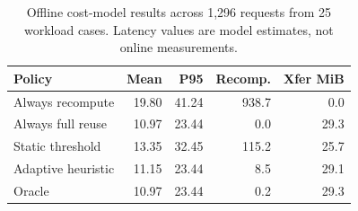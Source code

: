 \begin{table}[t]
\centering
\setlength{\tabcolsep}{3pt}
\footnotesize
\caption{Offline cost-model results across 1,296 requests from 25 workload cases. Latency values are model estimates, not online measurements.}
\label{tab:offline-summary}
\begin{tabular}{@{}lrrrr@{}}
\toprule
Policy & Mean & P95 & Recomp. & Xfer MiB \\
\midrule
Always recompute & 19.80 & 41.24 & 938.7 & 0.0 \\
Always full reuse & 10.97 & 23.44 & 0.0 & 29.3 \\
Static threshold & 13.35 & 32.45 & 115.2 & 25.7 \\
Adaptive heuristic & 11.15 & 23.44 & 8.5 & 29.1 \\
Oracle & 10.97 & 23.44 & 0.2 & 29.3 \\
\bottomrule
\end{tabular}
\end{table}
